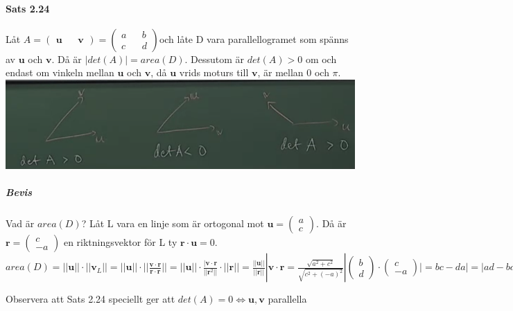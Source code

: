 \paragraph{Sats 2.24} Låt $A=\begin{pmatrix}\bm{u}&&\bm{v}\end{pmatrix}=\begin{pmatrix}a&&b\\c&&d\end{pmatrix}$och låte D vara parallellogramet som spänns av $\bm{u}$ och $\bm{v}$.
Då är $|det(A)|=area(D)$.
Dessutom är $det(A)>0$ om och endast om vinkeln mellan $\bm{u}$ och $\bm{v}$, då $\bm{u}$ vrids moturs till $\bm{v}$, är mellan 0 och $\pi$.\\
\includegraphics[scale=0.5]{imgs/22-01-31-img04.png}
\subparagraph{Bevis} Vad är $area(D)$?
Låt L vara en linje som är ortogonal mot $\bm{u}=\begin{pmatrix}
    a\\c
\end{pmatrix}$.
Då är $\bm{r}=\begin{pmatrix}
    c\\-a
\end{pmatrix}$ en riktningsvektor för L ty $\bm{r}\cdot \bm{u}=0$.\\
$area(D)=
||\bm{u}||\cdot ||\bm{v}_{L}||=
||\bm{u}||\cdot ||\frac{\bm{v}\cdot \bm{r}}{\bm{r}\cdot \bm{r}}||
=||\bm{u}||\cdot \frac{|\bm{v}\cdot \bm{r}}{||\bm{r}^{2}||}\cdot ||\bm{r}||=
\frac{||\bm{u}||}{||\bm{r}||}|\bm{v}\cdot\bm{r}=
\frac{\sqrt{a^{2}+c^{2}}}{\sqrt{c^{2}+(-a)^{2}}}|\begin{pmatrix}
    b\\d
\end{pmatrix}\cdot \begin{pmatrix}c\\-a\end{pmatrix}|=
bc-da|=
|ad-bc=
|det(A)|$

Observera att Sats 2.24 speciellt ger att $det(A)=0\Leftrightarrow \bm{u},\bm{v}$ parallella

